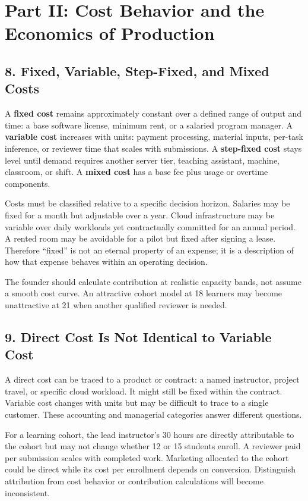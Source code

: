 \section*{Part II: Cost Behavior and the Economics of Production}

\subsection*{8. Fixed, Variable, Step-Fixed, and Mixed Costs}

A \textbf{fixed cost} remains approximately constant over a defined range of output and time: a base software license, minimum rent, or a salaried program manager. A \textbf{variable cost} increases with units: payment processing, material inputs, per-task inference, or reviewer time that scales with submissions. A \textbf{step-fixed cost} stays level until demand requires another server tier, teaching assistant, machine, classroom, or shift. A \textbf{mixed cost} has a base fee plus usage or overtime components.

Costs must be classified relative to a specific decision horizon. Salaries may be fixed for a month but adjustable over a year. Cloud infrastructure may be variable over daily workloads yet contractually committed for an annual period. A rented room may be avoidable for a pilot but fixed after signing a lease. Therefore ``fixed'' is not an eternal property of an expense; it is a description of how that expense behaves within an operating decision.

The founder should calculate contribution at realistic capacity bands, not assume a smooth cost curve. An attractive cohort model at 18 learners may become unattractive at 21 when another qualified reviewer is needed.

\subsection*{9. Direct Cost Is Not Identical to Variable Cost}

A direct cost can be traced to a product or contract: a named instructor, project travel, or specific cloud workload. It might still be fixed within the contract. Variable cost changes with units but may be difficult to trace to a single customer. These accounting and managerial categories answer different questions.

For a learning cohort, the lead instructor's 30 hours are directly attributable to the cohort but may not change whether 12 or 15 students enroll. A reviewer paid per submission scales with completed work. Marketing allocated to the cohort could be direct while its cost per enrollment depends on conversion. Distinguish attribution from cost behavior or contribution calculations will become inconsistent.

